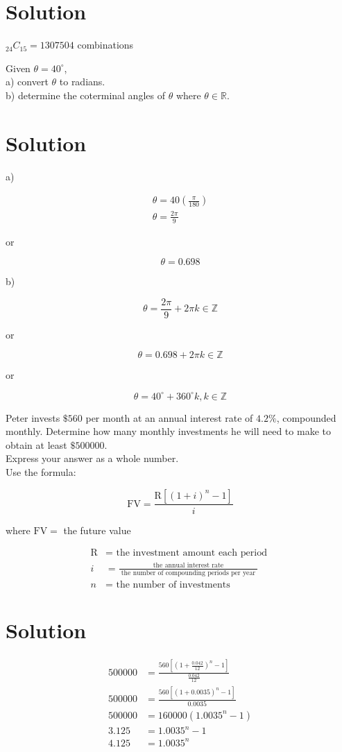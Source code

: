 \documentclass[10pt]{article}
\begin{document}
\section*{Solution}
${ }_{24} C_{15}=1307504$ combinations

Given $\theta=40^{\circ}$,\\
a) convert $\theta$ to radians.\\
b) determine the coterminal angles of $\theta$ where $\theta \in \mathbb{R}$.

\section*{Solution}
a)

$$
\begin{gathered}
\theta=40\left(\frac{\pi}{180}\right) \\
\theta=\frac{2 \pi}{9}
\end{gathered}
$$

or

$$
\theta=0.698
$$

b)

$$
\theta=\frac{2 \pi}{9}+2 \pi k \in \mathbb{Z}
$$

or

$$
\theta=0.698+2 \pi k \in \mathbb{Z}
$$

or

$$
\theta=40^{\circ}+360^{\circ} k, k \in \mathbb{Z}
$$

Peter invests $\$ 560$ per month at an annual interest rate of $4.2 \%$, compounded monthly. Determine how many monthly investments he will need to make to obtain at least $\$ 500000$.\\
Express your answer as a whole number.\\
Use the formula:

$$
\mathrm{FV}=\frac{\mathrm{R}\left[(1+i)^{n}-1\right]}{i}
$$

where $\mathrm{FV}=$ the future value

$$
\begin{aligned}
\mathrm{R} & =\text { the investment amount each period } \\
i & =\frac{\text { the annual interest rate }}{\text { the number of compounding periods per year }} \\
n & =\text { the number of investments }
\end{aligned}
$$

\section*{Solution}
$$
\begin{aligned}
500000 & =\frac{560\left[\left(1+\frac{0.042}{12}\right)^{n}-1\right]}{\frac{0.042}{12}} \\
500000 & =\frac{560\left[(1+0.0035)^{n}-1\right]}{0.0035} \\
500000 & =160000\left(1.0035^{n}-1\right) \\
3.125 & =1.0035^{n}-1 \\
4.125 & =1.0035^{n}
\end{aligned}
$$
\end{document}
